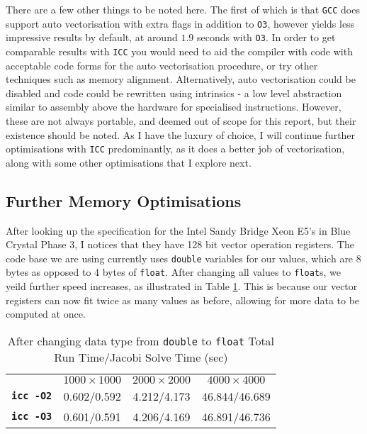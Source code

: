 \documentclass[10pt,twocolumn,a4paper]{article}
\def\tm{\texttrademark\xspace}
\begin{document}
There are a few other things to be noted here. The first of which is that \texttt{GCC} does support auto vectorisation with extra flags in addition to \texttt{O3}, however yields less impressive results by default, at around $1.9$ seconds with \texttt{O3}. In order to get comparable results with \texttt{ICC} you would need to aid the compiler with code with acceptable code forms for the auto vectorisation procedure, or try other techniques such as memory alignment. Alternatively, auto vectorisation could be disabled and code could be rewritten using intrinsics - a low level abstraction similar to assembly above the hardware for specialised instructions. However, these are not always portable, and deemed out of scope for this report, but their existence should be noted. As I have the luxury of choice, I will continue further optimisations with \texttt{ICC} predominantly, as it does a better job of vectorisation, along with some other optimisations that I explore next.

\subsection{Further Memory Optimisations}
After looking up the specification for the Intel\tm Sandy Bridge Xeon E5's in Blue Crystal Phase 3, I notices that they have 128 bit vector operation registers. The code base we are using currently uses \texttt{double} variables for our values, which are 8 bytes as opposed to 4 bytes of \texttt{float}. After changing all values to \texttt{float}s, we yeild further speed increases, as illustrated in Table \ref{floats}. This is because our vector registers can now fit twice as many values as before, allowing for more data to be computed at once. \par

\begin{table}
\small
\centering
\begin{tabular}{l|c|c|c}
    & \textbf{$1000\times1000$} & \textbf{$2000\times2000$} & \textbf{$4000\times4000$}   \\
\textbf{\texttt{icc -O2}} & 0.602/0.592 & 4.212/4.173 & 46.844/46.689 \\
\textbf{\texttt{icc -O3}} & 0.601/0.591 & 4.206/4.169 & 46.891/46.736 \\
\end{tabular}
\caption{After changing data type from \texttt{double} to \texttt{float} Total Run Time/Jacobi Solve Time (sec)}
\label{floats}
\end{table}\par
\end{document}

